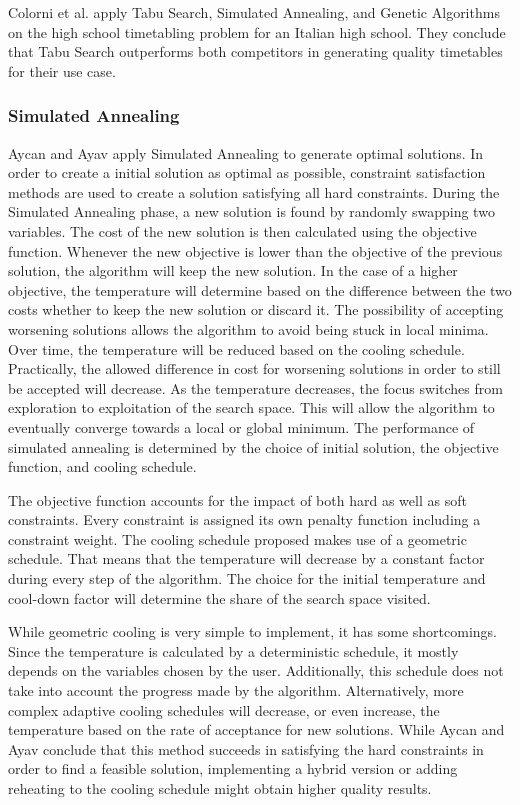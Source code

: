 Colorni et al. \cite{colorni1999} apply Tabu Search, Simulated Annealing, and Genetic Algorithms on the high school timetabling problem for an Italian high school. They conclude that Tabu Search outperforms both competitors in generating quality timetables for their use case.


\subsubsection{Simulated Annealing}

Aycan and Ayav \cite{aycan2009} apply Simulated Annealing \cite{kirkpatrick1983} to generate optimal solutions. In order to create a initial solution as optimal as possible, constraint satisfaction methods are used to create a solution satisfying all hard constraints. During the Simulated Annealing phase, a new solution is found by randomly swapping two variables. The cost of the new solution is then calculated using the objective function. Whenever the new objective is lower than the objective of the previous solution, the algorithm will keep the new solution. In the case of a higher objective, the temperature will determine based on the difference between the two costs whether to keep the new solution or discard it. The possibility of accepting worsening solutions allows the algorithm to avoid being stuck in local minima. Over time, the temperature will be reduced based on the cooling schedule. Practically, the allowed difference in cost for worsening solutions in order to still be accepted will decrease. As the temperature decreases, the focus switches from exploration to exploitation of the search space. This will allow the algorithm to eventually converge towards a local or global minimum. The performance of simulated annealing is determined by the choice of initial solution, the objective function, and cooling schedule. 

The objective function accounts for the impact of both hard as well as soft constraints. Every constraint is assigned its own penalty function including a constraint weight. The cooling schedule proposed makes use of a geometric schedule. That means that the temperature will decrease by a constant factor during every step of the algorithm. The choice for the initial temperature and cool-down factor will determine the share of the search space visited. 

While geometric cooling is very simple to implement, it has some shortcomings. Since the temperature is calculated by a deterministic schedule, it mostly depends on the variables chosen by the user. Additionally, this schedule does not take into account the progress made by the algorithm. Alternatively, more complex adaptive cooling schedules will decrease, or even increase, the temperature based on the rate of acceptance for new solutions. While Aycan and Ayav conclude that this method succeeds in satisfying the hard constraints in order to find a feasible solution, implementing a hybrid version or adding reheating to the cooling schedule might obtain higher quality results.

